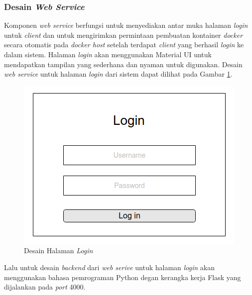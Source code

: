\subsubsection{Desain \textit{Web Service}}
Komponen \textit{web service} berfungsi untuk menyediakan antar muka halaman \textit{login} untuk \textit{client} dan untuk mengirimkan permintaan pembuatan kontainer \textit{docker} secara otomatis pada \textit{docker host} setelah terdapat \textit{client} yang berhasil \textit{login} ke dalam sistem. Halaman \textit{login} akan menggunakan Material UI untuk mendapatkan tampilan yang sederhana dan nyaman untuk digunakan. Desain \textit{web service} untuk halaman \textit{login} dari sistem dapat dilihat pada Gambar \ref{mockuplogin}.

\begin{figure}[H]
	\centering
	\includegraphics[width=\linewidth]{images/bab3/MockupLogin}
	\caption{Desain Halaman \textit{Login}}
	\label{mockuplogin}
\end{figure}

Lalu untuk desain \textit{backend} dari \textit{web serive} untuk halaman \textit{login} akan menggunakan bahasa pemrograman Python degan kerangka kerja Flask yang dijalankan pada \textit{port} 4000.

